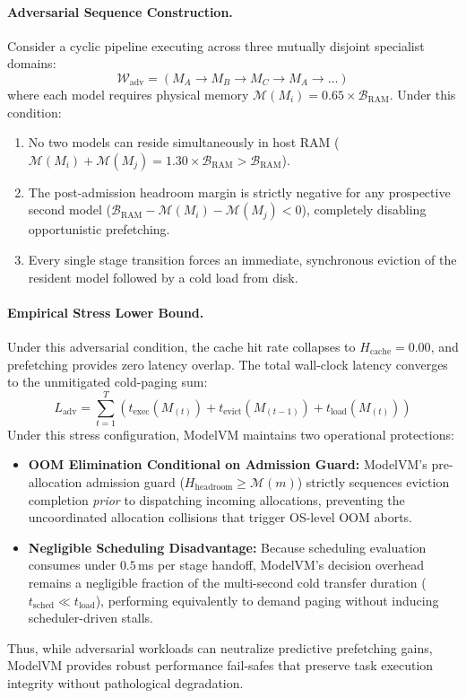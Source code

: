 \paragraph{Adversarial Sequence Construction.}
Consider a cyclic pipeline executing across three mutually disjoint specialist domains:
\begin{equation}
\mathcal{W}_{\text{adv}} = (M_A \to M_B \to M_C \to M_A \to \dots)
\end{equation}
where each model requires physical memory $\mathcal{M}(M_i) = 0.65 \times \mathcal{B}_{\text{RAM}}$. Under this condition:
\begin{enumerate}
    \item No two models can reside simultaneously in host RAM ($\mathcal{M}(M_i) + \mathcal{M}(M_j) = 1.30 \times \mathcal{B}_{\text{RAM}} > \mathcal{B}_{\text{RAM}}$).
    \item The post-admission headroom margin is strictly negative for any prospective second model ($\mathcal{B}_{\text{RAM}} - \mathcal{M}(M_i) - \mathcal{M}(M_j) < 0$), completely disabling opportunistic prefetching.
    \item Every single stage transition forces an immediate, synchronous eviction of the resident model followed by a cold load from disk.
\end{enumerate}

\paragraph{Empirical Stress Lower Bound.}
Under this adversarial condition, the cache hit rate collapses to $H_{\text{cache}} = 0.00$, and prefetching provides zero latency overlap. The total wall-clock latency converges to the unmitigated cold-paging sum:
\begin{equation}
L_{\text{adv}} = \sum_{t=1}^{T} \left( t_{\text{exec}}(M_{(t)}) + t_{\text{evict}}(M_{(t-1)}) + t_{\text{load}}(M_{(t)}) \right)
\end{equation}
Under this stress configuration, ModelVM maintains two operational protections:
\begin{itemize}
    \item \textbf{OOM Elimination Conditional on Admission Guard:} ModelVM's pre-allocation admission guard ($H_{\text{headroom}} \ge \mathcal{M}(m)$) strictly sequences eviction completion \textit{prior} to dispatching incoming allocations, preventing the uncoordinated allocation collisions that trigger OS-level OOM aborts.
    \item \textbf{Negligible Scheduling Disadvantage:} Because scheduling evaluation consumes under $0.5$\,ms per stage handoff, ModelVM's decision overhead remains a negligible fraction of the multi-second cold transfer duration ($t_{\text{sched}} \ll t_{\text{load}}$), performing equivalently to demand paging without inducing scheduler-driven stalls.
\end{itemize}
Thus, while adversarial workloads can neutralize predictive prefetching gains, ModelVM provides robust performance fail-safes that preserve task execution integrity without pathological degradation.
